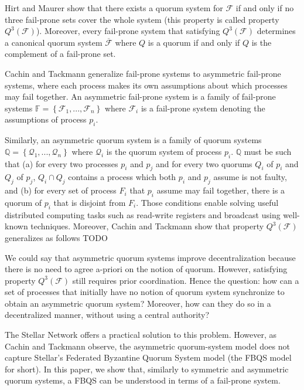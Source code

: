 \documentclass[11pt]{article}
\begin{document}
Hirt and Maurer show that there exists a quorum system for $\mathcal{F}$ if and only if no three fail-prone sets cover the whole system (this property is called property $Q^3(\mathcal{F})$). Moreover, every fail-prone system that satisfying $Q^3(\mathcal{F})$ determines a canonical quorum system $\overline{\mathcal{F}}$ where $Q$ is a quorum if and only if $Q$ is the complement of a fail-prone set.%

Cachin and Tackmann generalize fail-prone systems to asymmetric fail-prone systems, where each process makes its own assumptions about which processes may fail together. An asymmetric fail-prone system is a family of fail-prone systems $\mathbb{F}=\left\{\mathcal{F}_1,...,\mathcal{F}_n\right\}$ where $\mathcal{F}_i$ is a fail-prone system denoting the assumptions of process $p_i$.

Similarly, an asymmetric quorum system is a family of quorum systems $\mathbb{Q}=\left\{\mathcal{Q}_1,...,\mathcal{Q}_n\right\}$ where $\mathcal{Q}_i$ is the quorum system of process $p_i$. $\mathbb{Q}$ must be such that (a) for every two processes $p_i$ and $p_j$ and for every two quorums $Q_i$ of $p_i$ and $Q_j$ of $p_j$, $Q_i\cap Q_j$ contains a process which both $p_i$ and $p_j$ assume is not faulty, and (b) for every set of process $F_i$ that $p_i$ assume may fail together, there is a quorum of $p_i$ that is disjoint from $F_i$. Those conditions enable solving useful distributed computing tasks such as read-write registers and broadcast using well-known techniques. Moreover, Cachin and Tackmann show that property $Q^3(\mathcal{F})$ generalizes as follows TODO

We could say that asymmetric quorum systems improve decentralization because there is no need to agree a-priori on the notion of quorum. However, satisfying property $Q^3(\mathcal{F})$ still requires prior coordination. Hence the question: how can a set of processes that initially have no notion of quorum system synchronize to obtain an asymmetric quorum system? Moreover, how can they do so in a decentralized manner, without using a central authority?

The Stellar Network offers a practical solution to this problem. However, as Cachin and Tackmann observe, the asymmetric quorum-system model does not capture Stellar's Federated Byzantine Quorum System model (the FBQS model for short). In this paper, we show that, similarly to symmetric and asymmetric quorum systems, a FBQS can be understood in terms of a fail-prone system.
\end{document}
